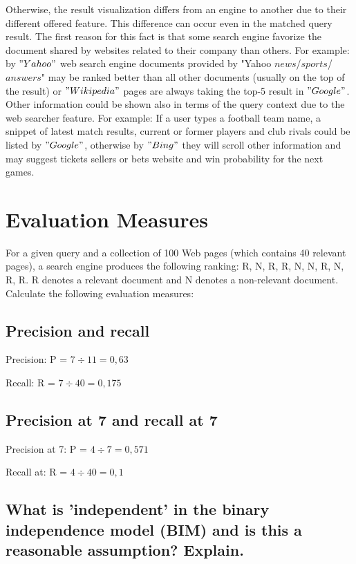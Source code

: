 \documentclass{scrartcl}
\begin{document}
Otherwise, the result visualization differs from an engine to another due to their different offered feature. This difference can occur even in the matched query result. The first reason for this fact is that some search engine favorize the document shared by websites related to their company than others. For example: by $"Yahoo"$ web search engine documents provided by "Yahoo $news$/$sports$/$answers$" may be ranked better than all other documents (usually on the top of the result) or $"Wikipedia"$ pages are always taking the top-5 result in $"Google"$. Other information could be shown also in terms of the query context due to the web searcher feature. For example: If a user types a football team name, a snippet of latest match results, current or former players and club rivals could be listed by $"Google"$, otherwise by $"Bing"$ they will scroll other information and may suggest tickets sellers or bets website and win probability for the next games. 


\section{Evaluation Measures}

For a given query and a collection of 100 Web pages (which contains 40 relevant pages), a search
engine produces the following ranking: R, N, R, R, N, N, R, N, R, R. R denotes a relevant document
and N denotes a non-relevant document. Calculate the following evaluation measures:


\subsection{Precision and recall  }

Precision: P = $ 7 \div 11 = 0,63$

Recall: R = $ 7 \div 40 = 0,175$

\subsection{Precision at 7 and recall at 7  }

Precision at 7: P = $ 4 \div 7 = 0,571$

Recall at: R = $ 4 \div 40 = 0,1$

\subsection{What is ’independent’ in the binary independence model (BIM) and is this a reasonable
assumption? Explain. }
\end{document}
